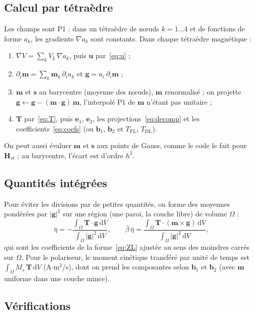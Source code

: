 \documentclass[11pt,a4paper]{article}
\newcommand{\vm}{\bm{m}}
\newcommand{\vs}{\bm{s}}
\newcommand{\vu}{\bm{u}}
\newcommand{\vg}{\bm{g}}
\newcommand{\vT}{\bm{T}}
\newcommand{\vH}{\bm{H}}
\newcommand{\ve}{\bm{e}}
\newcommand{\vb}{\bm{b}}
\begin{document}
\subsection{Calcul par tétraèdre}

Les champs sont P1 : dans un tétraèdre de nœuds $k=1\ldots4$ et de fonctions de forme $a_k$, les
gradients $\nabla a_k$ sont constants. Dans chaque tétraèdre magnétique :
\begin{enumerate}
  \item $\nabla V = \sum_k V_k\,\nabla a_k$, puis $\vu$ par~\eqref{eq:u} ;
  \item $\partial_i\vm = \sum_k \vm_k\,\partial_i a_k$ et $\vg = u_i\,\partial_i\vm$ ;
  \item $\vm$ et $\vs$ au barycentre (moyenne des nœuds), $\vm$ renormalisé ; on projette
    $\vg \leftarrow \vg - (\vm\cdot\vg)\,\vm$, l'interpolé P1 de $\vm$ n'étant pas unitaire ;
  \item $\vT$ par~\eqref{eq:T}, puis $\ve_1$, $\ve_2$, les projections~\eqref{eq:decomp} et les
    coefficients~\eqref{eq:coefs} (ou $\vb_1$, $\vb_2$ et $T_{\text{FL}}$, $T_{\text{DL}}$).
\end{enumerate}
On peut aussi évaluer $\vm$ et $\vs$ aux points de Gauss, comme le code le fait pour $\vH_{st}$ ;
au barycentre, l'écart est d'ordre $h^2$.

\subsection{Quantités intégrées}

Pour éviter les divisions par de petites quantités, on forme des moyennes pondérées par $|\vg|^2$
sur une région (une paroi, la couche libre) de volume $\Omega$ :
\begin{equation}
  \bar\eta = -\frac{\int_\Omega \vT\cdot\vg\,\mathrm dV}{\int_\Omega |\vg|^2\,\mathrm dV},
  \qquad
  \bar\beta\,\bar\eta = \frac{\int_\Omega \vT\cdot(\vm\times\vg)\,\mathrm dV}
  {\int_\Omega |\vg|^2\,\mathrm dV},
\end{equation}
qui sont les coefficients de la forme~\eqref{eq:ZL} ajustée au sens des moindres carrés sur
$\Omega$. Pour le polariseur, le moment cinétique transféré par unité de temps est
$\int_\Omega M_s\,\vT\,\mathrm dV$ (A$\cdot$m$^2$/s), dont on prend les composantes selon
$\vb_1$ et $\vb_2$ (avec $\vm$ uniforme dans une couche mince).

\subsection{Vérifications}
\end{document}
